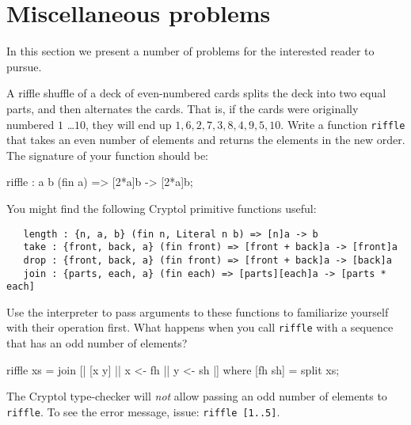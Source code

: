 
\chapter{Miscellaneous problems}


In this section we present a number of problems for the interested
reader to pursue.

\begin{Exercise}\label{ex:misc:riffle}
  A riffle shuffle of a deck of even-numbered cards splits the deck
  into two equal parts, and then alternates the cards. That is, if the
  cards were originally numbered $1$ \ldots $10$, they will end up $1,
  6, 2, 7, 3, 8, 4, 9, 5, 10$. Write a function {\tt riffle} that
  takes an even number of elements and returns the elements in the new
  order. The signature of your function should be:
\begin{code}
   riffle : {a b} (fin a) => [2*a]b -> [2*a]b;
\end{code}
You might find the following Cryptol primitive functions useful:
\begin{Verbatim}
   length : {n, a, b} (fin n, Literal n b) => [n]a -> b
   take : {front, back, a} (fin front) => [front + back]a -> [front]a
   drop : {front, back, a} (fin front) => [front + back]a -> [back]a
   join : {parts, each, a} (fin each) => [parts][each]a -> [parts * each]
\end{Verbatim}
Use the interpreter to pass arguments to these functions to
familiarize yourself with their operation first. What happens when you
call {\tt riffle} with a sequence that has an odd number of elements?
\end{Exercise}

\begin{Answer}
\begin{code}
  riffle xs = join [| [x y] || x <- fh || y <- sh |]
    where [fh sh] = split xs;
\end{code}
The Cryptol type-checker will {\em not} allow passing an odd number of
elements to {\tt riffle}. To see the error message, issue: {\tt riffle
  [1..5]}.
\end{Answer}

